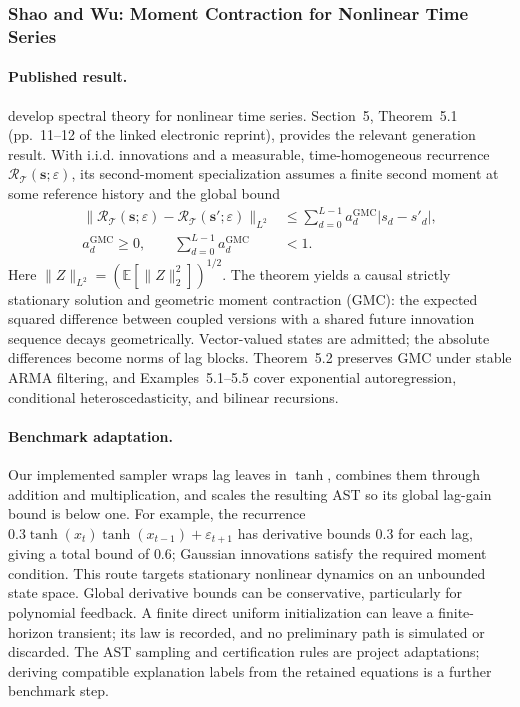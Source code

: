\subsubsection{Shao and Wu: Moment Contraction for Nonlinear Time Series}
\label{sec:shao-wu-gmc}

\paragraph{Published result.}
\citet{shao2007spectral} develop spectral theory for nonlinear time series.
Section~5, Theorem~5.1 (pp.~11--12 of the linked electronic reprint), provides
the relevant generation result. With i.i.d. innovations and a measurable,
time-homogeneous recurrence $\mathcal R_{\mathcal T}(\mathbf{s};\varepsilon)$,
its second-moment specialization assumes a finite second moment at some
reference history and the global bound
\begin{equation}
\begin{split}
 \|\mathcal R_{\mathcal T}(\mathbf{s};\varepsilon)
       -\mathcal R_{\mathcal T}(\mathbf{s}';\varepsilon)\|_{L^2}
 &\leq \sum_{d=0}^{L-1}a_d^{\mathrm{GMC}}|s_d-s'_d|,\\
 a_d^{\mathrm{GMC}}\geq0,\qquad
 \sum_{d=0}^{L-1}a_d^{\mathrm{GMC}}&<1.
\end{split}
\label{eq:gmc-generator}
\end{equation}
Here $\|Z\|_{L^2}=(\mathbb E[\|Z\|_2^2])^{1/2}$. The theorem yields a
causal strictly stationary solution and geometric moment contraction (GMC):
the expected squared difference between coupled versions with a shared future
innovation sequence decays geometrically. Vector-valued states are admitted;
the absolute differences become norms of lag blocks. Theorem~5.2 preserves
GMC under stable ARMA filtering, and Examples~5.1--5.5 cover exponential
autoregression, conditional heteroscedasticity, and bilinear recursions.

\paragraph{Benchmark adaptation.}
Our implemented sampler wraps lag leaves in $\tanh$, combines them through
addition and multiplication, and scales the resulting AST so its global
lag-gain bound is below one. For example,
the recurrence $0.3\tanh(x_t)\tanh(x_{t-1})+\varepsilon_{t+1}$ has
derivative bounds $0.3$ for each lag, giving a total bound of $0.6$; Gaussian
innovations satisfy the required moment condition. This route targets
stationary nonlinear dynamics on an unbounded state space. Global derivative
bounds can be conservative, particularly for polynomial feedback. A finite
direct uniform initialization can leave a finite-horizon transient; its law
is recorded, and no preliminary path is simulated or discarded. The AST
sampling and certification rules are project adaptations; deriving compatible
explanation labels from the retained equations is a further benchmark step.
